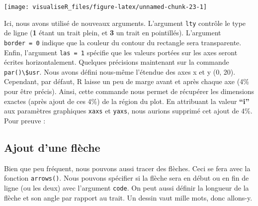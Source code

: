 \documentclass[]{article}
\newenvironment{Shaded}{\begin{snugshade}}{\end{snugshade}}
\newcommand{\CommentTok}[1]{\textcolor[rgb]{0.56,0.35,0.01}{\textit{#1}}}
\newcommand{\DataTypeTok}[1]{\textcolor[rgb]{0.13,0.29,0.53}{#1}}
\newcommand{\DecValTok}[1]{\textcolor[rgb]{0.00,0.00,0.81}{#1}}
\newcommand{\KeywordTok}[1]{\textcolor[rgb]{0.13,0.29,0.53}{\textbf{#1}}}
\newcommand{\NormalTok}[1]{#1}
\newcommand{\OperatorTok}[1]{\textcolor[rgb]{0.81,0.36,0.00}{\textbf{#1}}}
\newcommand{\StringTok}[1]{\textcolor[rgb]{0.31,0.60,0.02}{#1}}
\begin{document}
\begin{center}\texttt{[image: visualiseR\_files/figure-latex/unnamed-chunk-23-1]} \end{center}

Ici, nous avons utilisé de nouveaux arguments. L'argument \texttt{lty} contrôle le type de ligne (\textbf{1} étant un trait plein, et \textbf{3} un trait en pointillés). L'argument \texttt{border\ =\ 0} indique que la couleur du contour du rectangle sera transparente. Enfin, l'argument \texttt{las\ =\ 1} spécifie que les valeurs portées sur les axes seront écrites horizontalement.
Quelques précisions maintenant sur la commande \texttt{par()\textbackslash{}\$usr}. Nous avons défini nous-même l'étendue des axes x et y (0, 20). Cependant, par défaut, R laisse un peu de marge avant et après chaque axe (4\% pour être précis). Ainsi, cette commande nous permet de récupérer les dimensions exactes (après ajout de ces 4\%) de la région du plot. En attribuant la valeur \textbf{``i''} aux paramètres graphiques \texttt{xaxs} et \texttt{yaxs}, nous aurions supprimé cet ajout de 4\%. Pour preuve :

\begin{Shaded}
\end{Shaded}

\hypertarget{ajout-dune-fluxe8che}{%
\subsection{Ajout d'une flèche}\label{ajout-dune-fluxe8che}}

Bien que peu fréquent, nous pouvons aussi tracer des flèches. Ceci se fera avec la fonction \texttt{arrows()}. Nous pouvons spécifier si la flèche sera en début ou en fin de ligne (ou les deux) avec l'argument \texttt{code}. On peut aussi définir la longueur de la flèche et son angle par rapport au trait. Un dessin vaut mille mots, donc allons-y.
\end{document}
